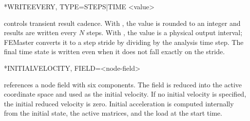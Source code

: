 \begin{syntax}
*WRITEEVERY, TYPE=STEPS|TIME
<value>
\end{syntax}

 controls transient result cadence. With , the value is rounded to an integer and results are written every \(N\) steps. With , the value is a physical output interval; FEMaster converts it to a step stride by dividing by the analysis time step. The final time state is written even when it does not fall exactly on the stride.

\begin{syntax}
*INITIALVELOCITY, FIELD=<node-field>
\end{syntax}

 references a node field with six components. The field is reduced into the active coordinate space and used as the initial velocity. If no initial velocity is specified, the initial reduced velocity is zero. Initial acceleration is computed internally from the initial state, the active matrices, and the load at the start time.
